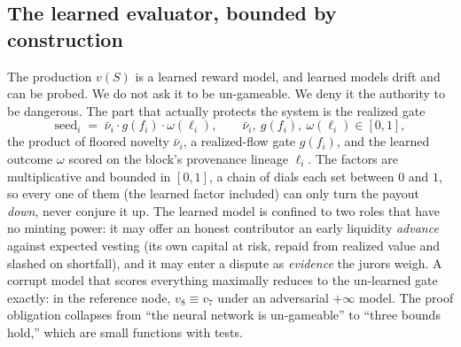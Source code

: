 \documentclass[10pt]{article}
\begin{document}
\subsection{The learned evaluator, bounded by construction}

The production $v(S)$ is a learned reward model, and learned models drift and can be probed. We do not
ask it to be un-gameable. We deny it the authority to be dangerous. The part that actually protects the
system is the realized gate
\begin{equation}
\mathrm{seed}_i \;=\; \bar\nu_i \cdot g(f_i)\cdot \omega(\ell_i),
\qquad \bar\nu_i,\ g(f_i),\ \omega(\ell_i)\in[0,1],
\end{equation}
the product of floored novelty $\bar\nu_i$, a realized-flow gate $g(f_i)$, and the learned outcome
$\omega$ scored on the block's provenance lineage $\ell_i$. The factors are multiplicative and bounded in
$[0,1]$, a chain of dials each set between $0$ and $1$, so every one of them (the learned factor
included) can only turn the payout \emph{down}, never conjure it up. The learned model is confined
to two roles that have no minting power: it may offer an honest contributor an early liquidity
\emph{advance} against expected vesting (its own capital at risk, repaid from realized value and
slashed on shortfall), and it may enter a dispute as \emph{evidence} the jurors weigh. A corrupt model
that scores everything maximally reduces to the un-learned gate exactly: in the reference node,
$v_8 \equiv v_7$ under an adversarial $+\infty$ model. The proof obligation collapses from ``the
neural network is un-gameable'' to ``three bounds hold,'' which are small functions with tests.
\end{document}
